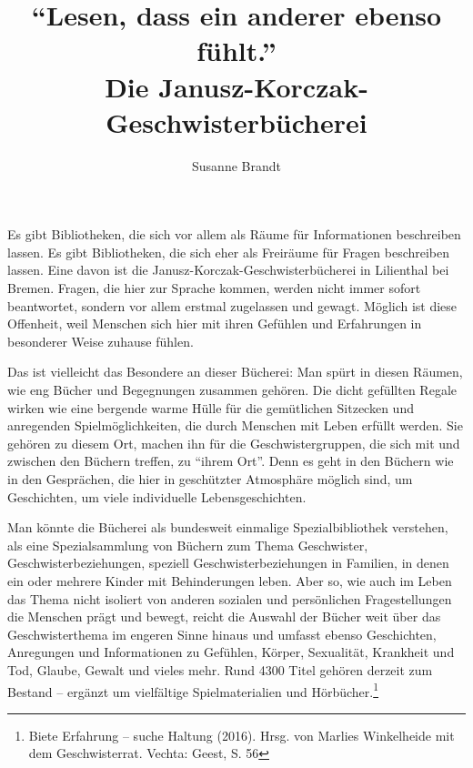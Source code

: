 \documentclass[a4paper,
fontsize=11pt,
oneside,
numbers=noperiodatend,
parskip=half-,
bibliography=totoc,
final
]{scrartcl}
\title{\LARGE{\enquote{Lesen, dass ein anderer ebenso fühlt.}\\ Die
    Janusz-Korczak-Geschwisterbücherei}} %
\author{Susanne Brandt} %
\date{}
\begin{document}
\maketitle
\thispagestyle{fancyplain} 


Es gibt Bibliotheken, die sich vor allem als Räume für Informationen
beschreiben lassen. Es gibt Bibliotheken, die sich eher als Freiräume
für Fragen beschreiben lassen. Eine davon ist die
Janusz-Korczak-Geschwisterbücherei in Lilienthal bei Bremen. Fragen, die
hier zur Sprache kommen, werden nicht immer sofort beantwortet, sondern
vor allem erstmal zugelassen und gewagt. Möglich ist diese Offenheit,
weil Menschen sich hier mit ihren Gefühlen und Erfahrungen in besonderer
Weise zuhause fühlen.

Das ist vielleicht das Besondere an dieser Bücherei: Man spürt in diesen
Räumen, wie eng Bücher und Begegnungen zusammen gehören. Die dicht
gefüllten Regale wirken wie eine bergende warme Hülle für die
gemütlichen Sitzecken und anregenden Spielmöglichkeiten, die durch
Menschen mit Leben erfüllt werden. Sie gehören zu diesem Ort, machen ihn
für die Geschwistergruppen, die sich mit und zwischen den Büchern
treffen, zu \enquote{ihrem Ort}. Denn es geht in den Büchern wie in den
Gesprächen, die hier in geschützter Atmosphäre möglich sind, um
Geschichten, um viele individuelle Lebensgeschichten.

Man könnte die Bücherei als bundesweit einmalige Spezialbibliothek
verstehen, als eine Spezialsammlung von Büchern zum Thema Geschwister,
Geschwisterbeziehungen, speziell Geschwisterbeziehungen in Familien, in
denen ein oder mehrere Kinder mit Behinderungen leben. Aber so, wie auch
im Leben das Thema nicht isoliert von anderen sozialen und persönlichen
Fragestellungen die Menschen prägt und bewegt, reicht die Auswahl der
Bücher weit über das Geschwisterthema im engeren Sinne hinaus und
umfasst ebenso Geschichten, Anregungen und Informationen zu Gefühlen,
Körper, Sexualität, Krankheit und Tod, Glaube, Gewalt und vieles mehr.
Rund 4300 Titel gehören derzeit zum Bestand -- ergänzt um vielfältige
Spielmaterialien und Hörbücher.\footnote{Biete Erfahrung -- suche
  Haltung (2016). Hrsg. von Marlies Winkelheide mit dem Geschwisterrat.
  Vechta: Geest, S. 56}
\end{document}
